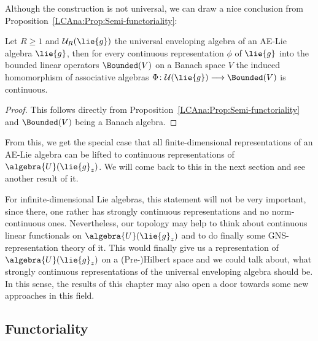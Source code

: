 Although the construction is not universal, we can draw a nice conclusion 
from Proposition~\ref{LCAna:Prop:Semi-functoriality}:
\begin{corollary}
    \label{LCAna:Coro:ContinuousRepresentations}%
    Let $R \geq 1$ and $\mathcal{U}_R(\lie{g})$ the universal
    enveloping algebra of an AE-Lie algebra $\lie{g}$, then for every
    continuous representation $\phi$ of $\lie{g}$ into the bounded
    linear operators $\Bounded(V)$ on a Banach space $V$ the induced
    homomorphism of associative algebras $\Phi \colon
    \mathcal{U}(\lie{g}) \longrightarrow \Bounded(V)$ is continuous.
\end{corollary}
\begin{proof}
    This follows directly from
    Proposition~\ref{LCAna:Prop:Semi-functoriality} and $\Bounded(V)$
    being a Banach algebra.
\end{proof}
\begin{remark}
	\mbox{}
	\begin{remarklist}
		\item
		From this, we get the special case that all finite-dimensional 
		representations of an AE-Lie algebra can be lifted to continuous 
		representations of $\algebra{U}(\lie{g}_z)$. We will come back to this 
		in the next section and see another result of it.
		
		\item
		For infinite-dimensional Lie algebras, this statement will not be very 
		important, since there, one rather has strongly continuous 
		representations and no norm-continuous ones. Nevertheless, our 
		topology may help to think about continuous linear functionals on 
		$\algebra{U}(\lie{g}_z)$ and to do finally some GNS-representation 
		theory of it. This would finally give us a representation of 
		$\algebra{U}(\lie{g}_z)$ on a (Pre-)Hilbert space and we could talk 
		about, what strongly continuous representations of the universal 
		enveloping algebra should be. In this sense, the results of this 
		chapter may also open a door towards some new approaches in this 
		field.
	\end{remarklist}
\end{remark}



\subsection{Functoriality}

